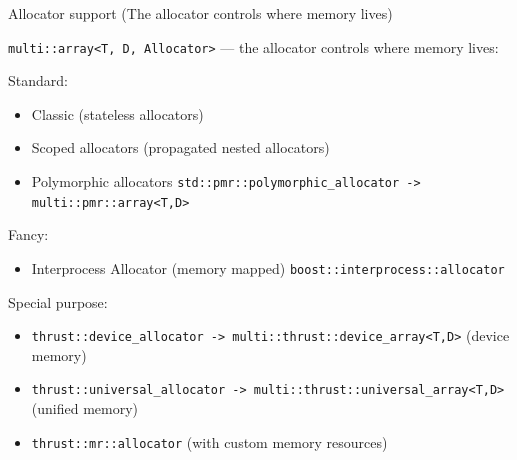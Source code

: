\documentclass[t,aspectratio=169,handout]{beamer}
\begin{document}
\begin{frame}[fragile,label=allocator1]{Allocator support (The allocator controls where memory lives)}

\lstinline|multi::array<T, D, Allocator>| --- the allocator controls where memory lives:

Standard:
\begin{itemize}
  \item Classic (stateless allocators)
  \item Scoped allocators (propagated nested allocators)
  \item Polymorphic allocators \lstinline|std::pmr::polymorphic_allocator -> multi::pmr::array<T,D>|
\end{itemize}

Fancy:
\begin{itemize}
  \item Interprocess Allocator (memory mapped) \lstinline|boost::interprocess::allocator|
\end{itemize}

Special purpose:
\begin{itemize}
  \item \lstinline|thrust::device_allocator -> multi::thrust::device_array<T,D>| (device memory)
  \item \lstinline|thrust::universal_allocator -> multi::thrust::universal_array<T,D>| (unified memory)
  \item \lstinline|thrust::mr::allocator| (with custom memory resources)
\end{itemize}
\end{frame}
\end{document}
